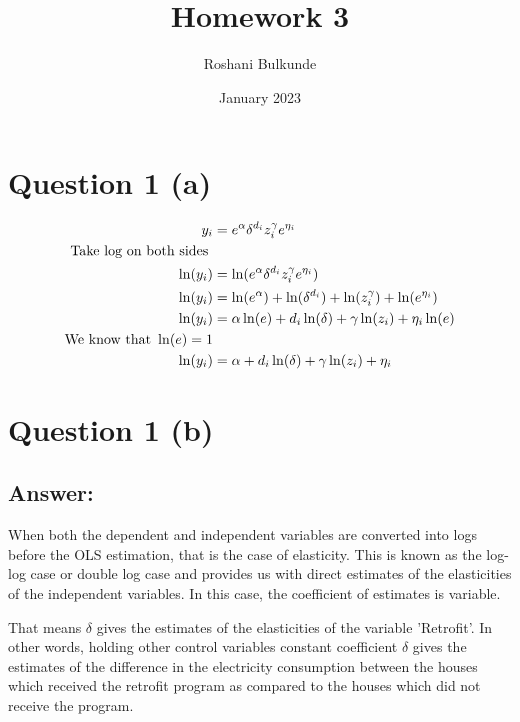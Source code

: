 \documentclass{article}
\title{Homework 3}
\author{Roshani Bulkunde}
\date{January 2023}
\begin{document}
\maketitle

\section{Question 1 (a)}

\begin{align}
    y_i &= e^{\alpha}{\delta}^{d_i} z_i^{\gamma} e^{\eta_i}\\
    \text{Take log on both sides } \notag\\
    \ln(y_i) &= \ln(e^{\alpha}{\delta}^{d_i} z_i^{\gamma} e^{\eta_i})\\
    \ln(y_i) &= \ln(e^{\alpha}) + \ln({\delta}^{d_i}) +  \ln(z_i^{\gamma}) +  \ln(e^{\eta_i}) \label{eq:betahat}\\
    \ln(y_i) &= {\alpha}\ln(e) + {d_i} \ln({\delta}) + {\gamma}\ln(z_i) +  {\eta_i}\ln(e) \\
    \text{We know that } \ln(e) = 1 \notag \\
     \ln(y_i) &= {\alpha} + {d_i} \ln({\delta}) + {\gamma}\ln(z_i) +  {\eta_i}
\end{align}

\section{Question 1 (b)}
\subsection{Answer:}
 When both the dependent and independent variables are converted into logs before the OLS estimation, that is the case of elasticity. This is known as the log-log case or double log case and provides us with direct estimates of the elasticities of the independent variables. In this case, the coefficient of estimates is variable.

That means $\delta$ gives the estimates of the elasticities of the variable 'Retrofit'. In other words,  holding other control variables constant coefficient $\delta$ gives the estimates of the difference in the electricity consumption between the houses which received the retrofit program as compared to the houses which did not receive the program.
\end{document}
